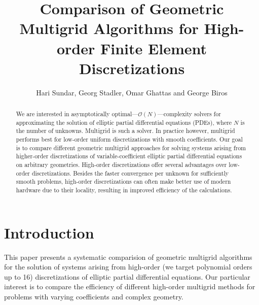 \documentclass[smallcondensed,final]{svjour3}     %
\begin{document}

\title{Comparison of Geometric Multigrid Algorithms for High-order Finite Element Discretizations}

\author{Hari Sundar, Georg Stadler, Omar Ghattas and George Biros}


\maketitle

\begin{abstract}
We are interested in asymptotically
optimal---$\mathcal{O}(N)$---complexity solvers for approximating the
solution of elliptic partial differential equations (PDEs), where $N$
is the number of unknowns.  Multigrid is such a solver. In practice
however, multigrid performs best for low-order uniform discretizations
with smooth coefficients.
%
Our goal is to compare different geometric multigrid approaches for
solving systems arising from higher-order discretizations of
variable-coefficient elliptic partial differential equations on
arbitrary geometries. High-order discretizations offer several
advantages over low-order discretizations. Besides the faster
convergence per unknown for sufficiently smooth problems, high-order
discretizations can often make better use of modern hardware due to
their locality, resulting in improved efficiency of the calculations.
\end{abstract}




\section{Introduction}

This paper presents a systematic comparision of geometric multigrid
algorithms for the solution of systems arising from high-order (we
target polynomial orders up to 16) discretizations of elliptic partial
differential equations. Our particular interest is to compare the
efficiency of different high-order multigrid methods for problems with
varying coefficients and complex geometry.
\end{document}
